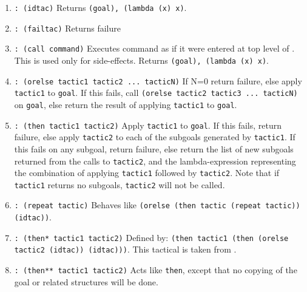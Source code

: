 \begin{enumerate}
\item %
{\tt {}: (idtac)}\newline{}
Returns {\tt (goal), (lambda (x) x)}.

\item {\tt {}: (failtac)}\newline{}
Returns failure

\item {\tt {}: (call command)}\newline{}
Executes command as if it were entered at top level of {\TPS}.  This is used
only for side-effects.  Returns {\tt (goal), (lambda (x) x)}.

\item {\tt {}: (orelse tactic1 tactic2 ... tacticN)}\newline{}
If N=0 return failure, else apply {\tt tactic1} to {\tt goal}. If this fails, call {\tt (orelse tactic2 tactic3 ... tacticN)} on {\tt goal}, else return the result of applying {\tt tactic1} to {\tt goal}.

\item {\tt {}: (then tactic1 tactic2)}\newline{}
Apply {\tt tactic1} to {\tt goal}. If this fails, return failure, else apply {\tt tactic2} to each of the subgoals generated by {\tt tactic1}.\newline{}
If this fails on any subgoal, return failure, else return the list of new subgoals returned from the calls to {\tt tactic2}, and the lambda-expression representing the combination of applying {\tt tactic1} followed by {\tt tactic2}.\newline{}
Note that if {\tt tactic1} returns no subgoals, {\tt tactic2} will not be called.

\item {\tt {}: (repeat tactic)}\newline{}
Behaves like {\tt (orelse (then tactic (repeat tactic)) (idtac))}.

\item {\tt {}: (then* tactic1 tactic2)}\newline{}
Defined by:\newline{}
{\tt (then tactic1 (then (orelse tactic2 (idtac)) (idtac)))}.  This tactical is taken from \cite{Felty86}.

\item {\tt {}: (then** tactic1 tactic2)}\newline{}
Acts like {\tt then}, except that no copying of the goal or related structures will be done.


\end{enumerate}
